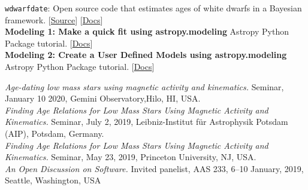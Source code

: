 \documentclass[10pt]{cv}
\begin{document}
\begin{llist}

\texttt{wdwarfdate}: Open source code that estimates ages of white dwarfs in a Bayesian framework. [\href{https://github.com/rkiman/wdwarfdate}{Source}] [\href{https://wdwarfdate.readthedocs.io/en/latest/}{Docs}] \\
\textbf{Modeling 1: Make a quick fit using astropy.modeling}
Astropy Python Package tutorial. [\href{http://learn.astropy.org/rst-tutorials/Models-Quick-Fit.html?highlight=filtertutorials}{Docs}]\\
\textbf{Modeling 2: Create a User Defined Models using astropy.modeling}
Astropy Python Package tutorial. [\href{http://learn.astropy.org/rst-tutorials/User-Defined-Model.html?highlight=filtertutorials}{Docs}] 


\textit{Age-dating low mass stars using magnetic activity and kinematics.} Seminar, January 10 2020, Gemini Observatory,Hilo, HI, USA.\\
\textit{Finding Age Relations for Low Mass Stars Using Magnetic Activity and Kinematics.} Seminar, July 2, 2019, Leibniz-Institut f\"{u}r Astrophysik Potsdam (AIP), Potsdam, Germany.\\
\textit{Finding Age Relations for Low Mass Stars Using Magnetic Activity and Kinematics.} Seminar, May 23, 2019, Princeton University, NJ, USA. \\
\textit{An Open Discussion on Software.} Invited panelist, AAS 233, 6--10 January, 2019, Seattle, Washington, USA



\end{llist}
\end{document}
